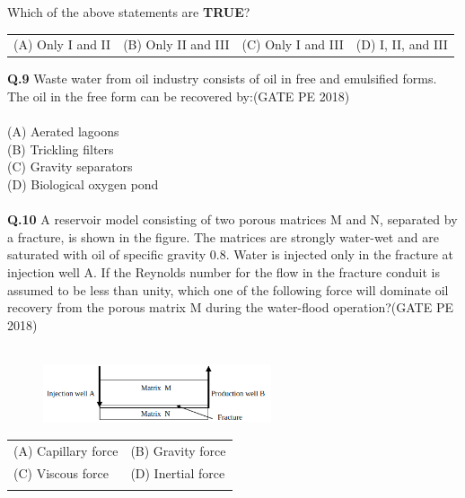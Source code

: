 \documentclass[12pt,a4paper]{article}
\begin{document}
Which of the above statements are \textbf{TRUE}?

\begin{center}
\begin{tabular}{llll}
	(A) Only I and II & (B) Only II and III & (C) Only I and III & (D) I, II, and III
\end{tabular}
\end{center}
\pagebreak

\noindent
\textbf{Q.9} \hspace{0.5em} Waste water from oil industry consists of oil in free and emulsified forms. The oil in the
free form can be recovered by:\hfill(GATE PE 2018)\\\\
(A) Aerated lagoons\\
(B) Trickling filters\\
(C) Gravity separators\\
(D) Biological oxygen pond\\\\

\noindent
\textbf{Q.10}\hspace{0.5em} A reservoir model consisting of two porous matrices M and N, separated by a fracture, is
shown in the figure. The matrices are strongly water-wet and are saturated with oil of
specific gravity 0.8. Water is injected only in the fracture at injection well A. If the
Reynolds number for the flow in the fracture conduit is assumed to be less than unity, which
one of the following force will dominate oil recovery from the porous matrix M during the
water-flood operation?\hfill(GATE PE 2018)\\\\

\begin{figure}[h!]
  \centering
  \includegraphics[width=0.6\textwidth]{pic5.png} 
\end{figure}
\begin{center}
\begin{tabular}{ll}

	(A) Capillary force & \hspace{0.9em}(B) Gravity force\\
	(C) Viscous force & \hspace{0.9em}(D) Inertial force\\\\
\end{tabular}
\end{center}
\end{document}
